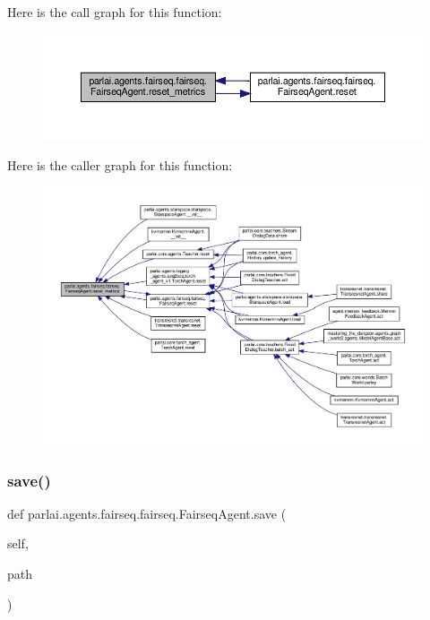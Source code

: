 Here is the call graph for this function\+:
\nopagebreak
\begin{figure}[H]
\begin{center}
\leavevmode
\includegraphics[width=350pt]{classparlai_1_1agents_1_1fairseq_1_1fairseq_1_1FairseqAgent_a029d7193a532d4cf75433e82817ab414_cgraph}
\end{center}
\end{figure}
Here is the caller graph for this function\+:
\nopagebreak
\begin{figure}[H]
\begin{center}
\leavevmode
\includegraphics[width=350pt]{classparlai_1_1agents_1_1fairseq_1_1fairseq_1_1FairseqAgent_a029d7193a532d4cf75433e82817ab414_icgraph}
\end{center}
\end{figure}
\mbox{\label{classparlai_1_1agents_1_1fairseq_1_1fairseq_1_1FairseqAgent_ad4804131388a6f88f01fc124e7692069}} 
\subsubsection{\texorpdfstring{save()}{save()}}
{\footnotesize\ttfamily def parlai.\+agents.\+fairseq.\+fairseq.\+Fairseq\+Agent.\+save (\begin{DoxyParamCaption}\item[{}]{self,  }\item[{}]{path }\end{DoxyParamCaption})}

